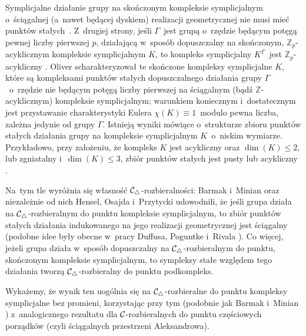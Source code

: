 Symplicjalne działanie grupy na skończonym kompleksie symplicjalnym o~ściągalnej (a~nawet będącej dyskiem) realizacji geometrycznej nie musi mieć punktów stałych~\cite{Floyd59}. Z~drugiej strony, jeśli $\Gamma$~jest grupą o~rzędzie będącym potęgą pewnej liczby pierwszej $p$, działającą w~sposób dopuszczalny na skończonym, $\mathbb{Z}_p$-acyklicznym kompleksie symplicjalnym $K$, to kompleks symplicjalny $K^\Gamma$~jest $\mathbb{Z}_p$-acykliczny \cite{Smith42}. Oliver \cite{Oliver75} scharakteryzował te skończone kompleksy symplicjalne $K$, które są kompleksami punktów stałych dopuszczalnego działania grupy $\Gamma$~o~rzędzie nie będącym potęgą liczby pierwszej na ściągalnym (bądź $\mathbb{Z}$-acyklicznym) kompleksie symplicjalnym; warunkiem koniecznym i~dostatecznym jest przystawanie charakterystyki Eulera $\chi(K)\equiv 1$~modulo pewna liczba, zależna jedynie od grupy $\Gamma$. Istnieją wyniki mówiące o~strukturze zbioru punktów stałych działania grupy na kompleksie symplicjalnym $K$~o~niskim wymiarze. Przykładowo, przy założeniu, że kompleks $K$ jest acykliczny oraz $\dim(K)\leq 2$, lub zgniatalny i~$\dim(K)\leq 3$, zbiór punktów stałych jest pusty lub acykliczny \cite{Segev93,Segev94}.

Na~tym tle wyróżnia się własność $\mathcal{C}_\triangle$-rozbieralności: Barmak i~Minian \cite[Theorem 6.5]{Barmak12} oraz niezależnie od nich Hensel, Osajda i~Przytycki \cite[Theorem 1.2]{Hensel14} udowodnili, że jeśli grupa działa na \mbox{$\mathcal{C}_\triangle$-rozbieralnym} do punktu kompleksie symplicjalnym, to zbiór punktów stałych działania indukowanego na jego realizacji geometrycznej jest ściągalny (podobne idee były obecne w~pracy Duffusa, Poguntke i~Rivala \cite{Duffus80a}). Co więcej, jeżeli grupa działa w~sposób dopuszczalny na $\mathcal{C}_\triangle$-rozbieralnym do punktu, skończonym kompleksie symplicjalnym, to sympleksy stałe względem tego działania tworzą $\mathcal{C}_\triangle$-rozbieralny do punktu podkompleks.

Wykażemy, że wynik ten uogólnia się na $\mathcal{C}_\triangle$-rozbieralne do punktu kompleksy symplicjalne bez promieni, korzystając przy tym (podobnie jak Barmak i~Minian \cite{Barmak12}) z~analogicznego rezultatu dla $\mathcal{C}$-rozbieralnych do punktu częściowych porządków (czyli ściągalnych przestrzeni Aleksandrowa).

